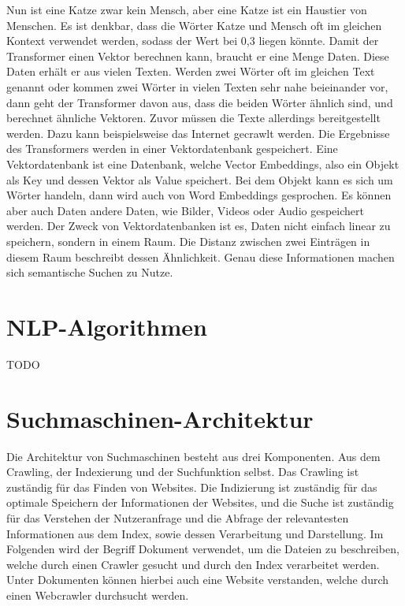 Nun ist eine Katze zwar kein Mensch, aber eine Katze ist ein Haustier von Menschen.
Es ist denkbar, dass die Wörter Katze und Mensch oft im gleichen Kontext verwendet werden, sodass der Wert bei 0,3 liegen könnte.
Damit der Transformer einen Vektor berechnen kann, braucht er eine Menge Daten.
Diese Daten erhält er aus vielen Texten.
Werden zwei Wörter oft im gleichen Text genannt oder kommen zwei Wörter in vielen Texten sehr nahe beieinander vor, dann geht der Transformer davon aus, dass die beiden Wörter ähnlich sind, und berechnet ähnliche Vektoren.
Zuvor müssen die Texte allerdings bereitgestellt werden.
Dazu kann beispielsweise das Internet gecrawlt werden.
Die Ergebnisse des Transformers werden in einer Vektordatenbank gespeichert.
Eine Vektordatenbank ist eine Datenbank, welche Vector Embeddings, also ein Objekt als Key und dessen Vektor als Value speichert.
Bei dem Objekt kann es sich um Wörter handeln, dann wird auch von Word Embeddings gesprochen.
Es können aber auch Daten andere Daten, wie Bilder, Videos oder Audio gespeichert werden.
Der Zweck von Vektordatenbanken ist es, Daten nicht einfach linear zu speichern, sondern in einem Raum.
Die Distanz zwischen zwei Einträgen in diesem Raum beschreibt dessen Ähnlichkeit.
Genau diese Informationen machen sich semantische Suchen zu Nutze.

\section{NLP-Algorithmen}

TODO

\section*{Suchmaschinen-Architektur}


Die Architektur von Suchmaschinen besteht aus drei Komponenten.
Aus dem Crawling, der Indexierung und der Suchfunktion selbst.
Das Crawling ist zuständig für das Finden von Websites.
Die Indizierung ist zuständig für das optimale Speichern der Informationen der Websites, und die Suche ist zuständig für das Verstehen der Nutzeranfrage und die Abfrage der relevantesten Informationen aus dem Index, sowie dessen Verarbeitung und Darstellung.
Im Folgenden wird der Begriff Dokument verwendet, um die Dateien zu beschreiben, welche durch einen Crawler gesucht und durch den Index verarbeitet werden.
Unter Dokumenten können hierbei auch eine Website verstanden, welche durch einen Webcrawler durchsucht werden.

